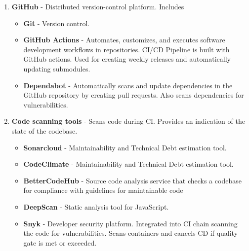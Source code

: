 \begin{enumerate}
    \item \textbf{GitHub} - Distributed version-control platform. Includes
    \begin{itemize}
        \item \textbf{Git} - Version control.
        \item \textbf{GitHub Actions} - Automates, customizes, and executes software development workflows in repositories. CI/CD Pipeline is built with GitHub actions. Used for creating weekly releases and automatically updating submodules.
        \item \textbf{Dependabot} - Automatically scans and update dependencies in the GitHub repository by creating pull requests. Also scans dependencies for vulnerabilities.
    \end{itemize}
    
    \item \textbf{Code scanning tools} - Scans code during CI. Provides an indication of the state of the codebase.
    \begin{itemize}
        \item \textbf{Sonarcloud} - Maintainability and Technical Debt estimation tool.
        \item \textbf{CodeClimate} -  Maintainability and Technical Debt estimation tool.
        \item \textbf{BetterCodeHub} -  Source code analysis service that checks a codebase for compliance with guidelines for maintainable code
        \item \textbf{DeepScan} - Static analysis tool for JavaScript.
        \item \textbf{Snyk} - Developer security platform. Integrated into CI chain scanning the code for vulnerabilities. Scans containers and cancels CD if quality gate is met or exceeded.
    \end{itemize}
    

\end{enumerate}

